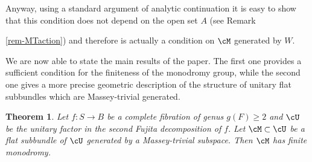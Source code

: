 \documentclass[a4paper,11pt]{amsart}
\newtheorem{theorem}{Theorem}[section]
\DeclareMathOperator{\Ima}{Im}
\begin{document}
 Anyway, using a standard argument of analytic continuation it is easy to show that this condition does not depend on the open set $A$ (see Remark {\ref{rem-MTaction}) and therefore is actually a condition on $\cM$ generated by $W.$ 


 
We are now able to state the main results of the paper. The first one provides a sufficient condition for the finiteness of the monodromy group, while the second one gives a more precise geometric description of the structure of unitary flat subbundles which are Massey-trivial generated.
\begin{theorem}\label{Thm-MainG}Let $f:S\to B$ be a complete fibration of genus $g(F)\geq 2$ and $\cU$ be the unitary factor in the second Fujita decomposition of $f.$ Let $\cM\subset \cU$ be a flat subbundle of $\cU$ generated by a Massey-trivial subspace. Then $\cM$ has finite monodromy.
\end{theorem}

}
\end{document}
